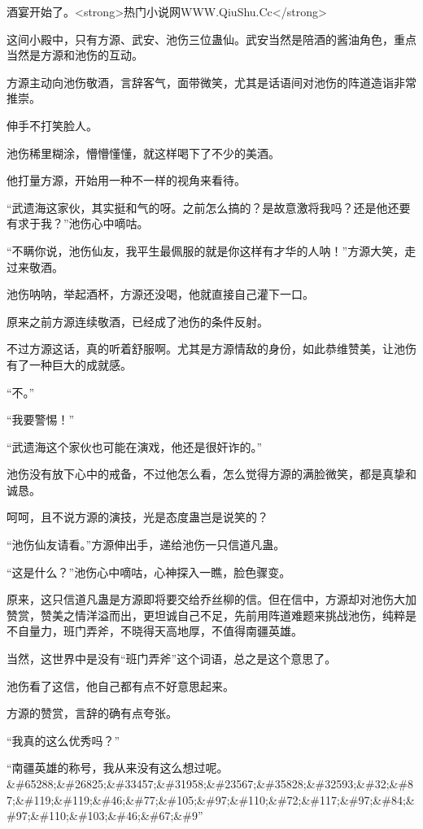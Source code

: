 
\begin{this_body}

酒宴开始了。<strong>热门小说网WWW.QiuShu.Cc</strong>

这间小殿中，只有方源、武安、池伤三位蛊仙。武安当然是陪酒的酱油角色，重点当然是方源和池伤的互动。

方源主动向池伤敬酒，言辞客气，面带微笑，尤其是话语间对池伤的阵道造诣非常推崇。

伸手不打笑脸人。

池伤稀里糊涂，懵懵懂懂，就这样喝下了不少的美酒。

他打量方源，开始用一种不一样的视角来看待。

“武遗海这家伙，其实挺和气的呀。之前怎么搞的？是故意激将我吗？还是他还要有求于我？”池伤心中嘀咕。

“不瞒你说，池伤仙友，我平生最佩服的就是你这样有才华的人呐！”方源大笑，走过来敬酒。

池伤呐呐，举起酒杯，方源还没喝，他就直接自己灌下一口。

原来之前方源连续敬酒，已经成了池伤的条件反射。

不过方源这话，真的听着舒服啊。尤其是方源情敌的身份，如此恭维赞美，让池伤有了一种巨大的成就感。

“不。”

“我要警惕！”

“武遗海这个家伙也可能在演戏，他还是很奸诈的。”

池伤没有放下心中的戒备，不过他怎么看，怎么觉得方源的满脸微笑，都是真挚和诚恳。

呵呵，且不说方源的演技，光是态度蛊岂是说笑的？

“池伤仙友请看。”方源伸出手，递给池伤一只信道凡蛊。

“这是什么？”池伤心中嘀咕，心神探入一瞧，脸色骤变。

原来，这只信道凡蛊是方源即将要交给乔丝柳的信。但在信中，方源却对池伤大加赞赏，赞美之情洋溢而出，更坦诚自己不足，先前用阵道难题来挑战池伤，纯粹是不自量力，班门弄斧，不晓得天高地厚，不值得南疆英雄。

当然，这世界中是没有“班门弄斧”这个词语，总之是这个意思了。

池伤看了这信，他自己都有点不好意思起来。

方源的赞赏，言辞的确有点夸张。

“我真的这么优秀吗？”

“南疆英雄的称号，我从来没有这么想过呢。\&\#65288;\&\#26825;\&\#33457;\&\#31958;\&\#23567;\&\#35828;\&\#32593;\&\#32;\&\#87;\&\#119;\&\#119;\&\#46;\&\#77;\&\#105;\&\#97;\&\#110;\&\#72;\&\#117;\&\#97;\&\#84;\&\#97;\&\#110;\&\#103;\&\#46;\&\#67;\&\#9”


\end{this_body}
